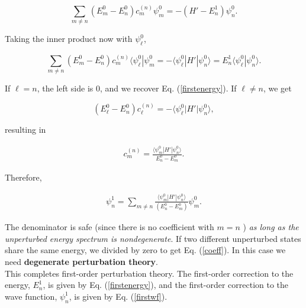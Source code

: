 \documentclass[svgnames]{article}     %
\begin{document}
\[
\sum_{m\neq n}^{} \left( E_m^{0} - E_n^{0}  \right) c_m^{(n)} \psi_m^{0}
= -\left( H' - E_n^{1} \right) \psi_n^{0}.  
\] \vspace{3px}

Taking the inner product now with $\psi_\ell^{0}$, 

\[
\sum_{m\neq n}^{} \left( E_m^{0} - E_n^{0} \right) c_m^{(n)} \langle \psi_\ell^{0}
| \psi_m^{0} = -\langle \psi_\ell^{0} | H' | \psi_n^{0} \rangle = E_n^1 \langle
\psi_\ell^{0} | \psi_n^{0} \rangle.
\] \vspace{3px}

If $\ell = n$, the left side is 0, and we recover Eq. (\ref{firstenergy}). If
$\ell \neq n$, we get 

\[
\left( E_\ell^{0} - E_n^{0}  \right) c_\ell^{(n)} = -\langle \psi_\ell^{0} | H'
| \psi_n^{0} \rangle,
\] \vspace{3px}

resulting in 

\begin{align} \label{coeff}
  c_m^{(n)} = \frac{\langle \psi_m^{0} | H' | \psi_n^0\rangle}{E_n^{0}
  - E_m^{0}}.
\end{align}\vspace{3px}

Therefore, 

\vspace{3px}
\begin{tcolorbox}[colback = blue!5!white, colframe = blue!50!black, title
  = First Order Correction to Wave Function]

  \begin{align} \label{firstwf}
    \psi_n^{1} = \sum_{m\neq n} \frac{{\langle \psi_m^{0}| H'  |\psi_n^0
    \rangle} }{(E_n^0 - E_m^0)} \psi_m^0.
  \end{align}

\end{tcolorbox}
\vspace{3px}
The denominator is safe (since there is no coefficient with $m = n$
) \textit{as long as the unperturbed energy spectrum is nondegenerate}. If two
different unperturbed states share the same energy, we divided by zero to get
Eq. (\ref{coeff}). In this case we need \textbf{degenerate perturbation
theory}. \\

This completes first-order perturbation theory. The first-order correction to
the energy, $E_n^1$, is given by Eq. (\ref{firstenergy}), and the first-order
correction to the wave function, $\psi_n^1$, is given by Eq. (\ref{firstwf}). 
\end{document}
